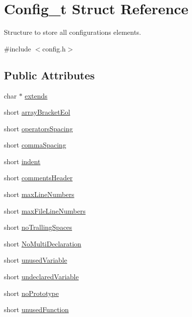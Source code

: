 \hypertarget{structConfig__t}{}\section{Config\+\_\+t Struct Reference}
\label{structConfig__t}


Structure to store all configurations elements.  




{\ttfamily \#include $<$config.\+h$>$}

\subsection*{Public Attributes}
\begin{DoxyCompactItemize}
\item 
char $\ast$ \hyperlink{structConfig__t_a1dd391e253a5a3bc3d27bb986977f593}{extends}
\item 
short \hyperlink{structConfig__t_a638fad6042df80f4ddef34593654dd9d}{array\+Bracket\+Eol}
\item 
short \hyperlink{structConfig__t_a358f05ff06ff962ffac4573d120d52a5}{operators\+Spacing}
\item 
short \hyperlink{structConfig__t_a65d13a772c2b16fdcf47404c4eca2c70}{comma\+Spacing}
\item 
short \hyperlink{structConfig__t_a9812b0788540b97410f06ca3c449f4f9}{indent}
\item 
short \hyperlink{structConfig__t_af39c67047e4a3554d6a3ee63fe557835}{comments\+Header}
\item 
short \hyperlink{structConfig__t_a1396cdd37b3769c1e7acc8421fc6299f}{max\+Line\+Numbers}
\item 
short \hyperlink{structConfig__t_a0cdf48abfd86bbec74f265ae23bf47fe}{max\+File\+Line\+Numbers}
\item 
short \hyperlink{structConfig__t_ad284d677c7abe2aa97d7eb01082e264d}{no\+Tralling\+Spaces}
\item 
short \hyperlink{structConfig__t_a2d4508be47969205d76d73c1f2658e3a}{No\+Multi\+Declaration}
\item 
short \hyperlink{structConfig__t_af2c9852fc94e9d3ae2cd54f5750dd37f}{unused\+Variable}
\item 
short \hyperlink{structConfig__t_a704e6830c0e2d93a5441300ae6592aec}{undeclared\+Variable}
\item 
short \hyperlink{structConfig__t_a9ab1cbe58615ccaab6479f4ef607d3f4}{no\+Prototype}
\item 
short \hyperlink{structConfig__t_aa2d06bad2fc7b51d26e0bae0032c4da3}{unused\+Function}

\end{DoxyCompactItemize}
